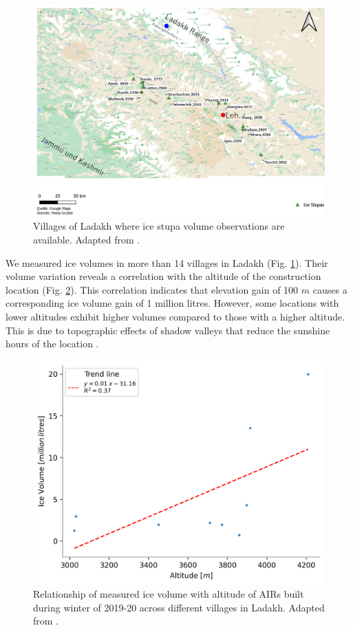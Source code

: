 \begin{figure}[htb]
	\includegraphics[width=\textwidth]{figs/ISC_villages}
	\caption{Villages of Ladakh where ice stupa volume observations are available. Adapted from \citet{mariagruberIceStupasLadakh2022}.}
	\label{fig:villages}
\end{figure}

We measured ice volumes in more than 14 villages in Ladakh (Fig. \ref{fig:villages}). Their volume variation
reveals a correlation with the altitude of the construction location (Fig. \ref{fig:altvsvol}). This correlation
indicates that elevation gain of 100 $m$ causes a corresponding ice volume gain of 1 million litres. However,
some locations with lower altitudes exhibit higher volumes compared to those with a higher altitude. This is due
to topographic effects of shadow valleys that reduce the sunshine hours of the location
\citep{mariagruberIceStupasLadakh2022}.

\begin{figure}[htb]
	\centering
	\includegraphics[width=\textwidth]{figs/altitudevsvolume.png}
	\caption{Relationship of measured ice volume with altitude of \ac{AIRs} built during winter of 2019-20 across
		different villages in Ladakh. Adapted from \citet{mariagruberIceStupasLadakh2022}.}
	\label{fig:altvsvol}
\end{figure}

